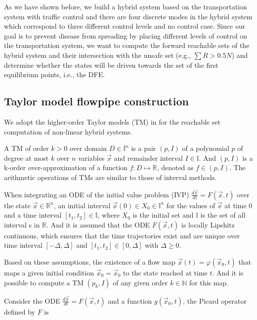 \documentclass[review]{elsarticle}
\theoremstyle{plain}
\theoremstyle{definition}
\theoremstyle{remark}
\numberwithin{equation}{section}
\theoremstyle{remark}
\begin{document}
As we have shown before, we build a hybrid system based on the transportation system with traffic control and there are four discrete modes in the hybrid system which correspond to three different control levels and no control case. Since our goal is to prevent disease from spreading by placing different levels of control on the transportation system, we want to compute the forward reachable sets of the hybrid system and their intersection with the unsafe set (e.g., $\sum R > 0.5N$) and determine whether the states will be driven towards the set of the first equilibrium points, i.e., the DFE. 

\subsection{Taylor model flowpipe construction}

We adopt the higher-order Taylor models (TM) in \cite{chen2012taylor} for the reachable set computation of non-linear hybrid systems.

A TM of order $k>0$ over domain $D\in \mathbb{I}^n$ is a pair $(p,I)$ of a polynomial $p$ of degree at most $k$ over $n$ variables $\vec{x}$ and remainder interval $I \in \mathbb{I}$. And $(p,I)$ is a k-order over-approximation of a function $f:D\mapsto \mathbb{R}$, denoted as $f\in (p,I)$. The arithmetic operations of TMs are similar to those of interval methods.

When integrating an ODE of the initial value problem (IVP) $\frac{d\vec{x}}{dt}=F(\vec{x},t)$ over the state $\vec{x}\in \mathbb{R}^n$, an initial interval $\vec{x}(0)\in X_0 \in \mathbb{I}^n$ for the values of $\vec{x}$ at time $0$ and a time interval $[t_1,t_2]\in \mathbb{I}$, where $X_0$ is the initial set and $\mathbb{I}$ is the set of all interval s in $\mathbb{R}$. And it is assumed that the ODE $F(\vec{x},t)$ is locally Lipshitz continuous, which ensures that the time trajectories exist and are unique over time interval $[-\Delta,\Delta]$ and $[t_1,t_2]\in [0,\Delta]$ with $\Delta \ge 0$. \par 

Based on these assumptions, the existence of a flow map $\vec{x}(t)=\varphi (\vec{x}_0,t)$ that maps a given initial condition $\vec{x}_0=\vec{x}_0$ to the state reached at time $t$. And it is possible to compute a TM $(p_k,I)$ of any given order $k\in \mathbb{N}$ for this map.\par 

Consider the ODE $\frac{d\vec{x}}{dt}=F(\vec{x},t)$ and a function $g(\vec{x}_0,t)$, the Picard operator defined by $F$ is 
\end{document}
